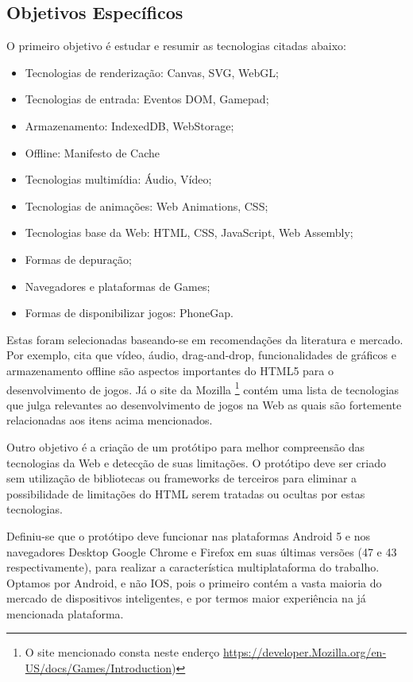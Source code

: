 \subsection{Objetivos Específicos}

\noindent O primeiro objetivo é estudar e resumir as tecnologias citadas abaixo:

\begin{itemize}
\item Tecnologias de renderização: Canvas, SVG, WebGL;
\item Tecnologias de entrada: Eventos DOM, Gamepad;
\item Armazenamento: IndexedDB, WebStorage;
\item Offline: Manifesto de Cache
\item Tecnologias multimídia: Áudio, Vídeo;
\item Tecnologias de animações: Web Animations, CSS;
\item Tecnologias base da Web: HTML, CSS, JavaScript, Web Assembly;
\item Formas de depuração;
\item Navegadores e plataformas de Games;
\item Formas de disponibilizar jogos: PhoneGap.
\end{itemize}

Estas foram selecionadas baseando-se em recomendações da literatura
e mercado. Por exemplo, \citet{browserGamesTechnologyAndFuture}
cita que vídeo, áudio, drag-and-drop, funcionalidades de
gráficos e armazenamento offline são aspectos importantes do
HTML5 para o desenvolvimento de jogos. Já o site da Mozilla
\footnote{O site mencionado consta neste enderço \url{https://developer.Mozilla.org/en-US/docs/Games/Introduction})}
contém uma lista de tecnologias que julga relevantes ao desenvolvimento
de jogos na Web as quais são fortemente relacionadas aos itens acima
mencionados.

Outro objetivo é a criação de um protótipo para melhor compreensão
das tecnologias da Web e detecção de suas limitações. O protótipo
deve ser criado sem utilização de bibliotecas ou frameworks de
terceiros para eliminar a possibilidade de limitações do HTML serem
tratadas ou ocultas por estas tecnologias.

Definiu-se que o protótipo deve funcionar nas plataformas Android
5 e nos navegadores Desktop Google Chrome e Firefox em suas últimas
versões (47 e 43 respectivamente), para realizar a característica
multiplataforma do trabalho. Optamos por Android, e não IOS, pois
o primeiro contém a vasta maioria do mercado de dispositivos
inteligentes, e por termos maior experiência na já mencionada
plataforma.

